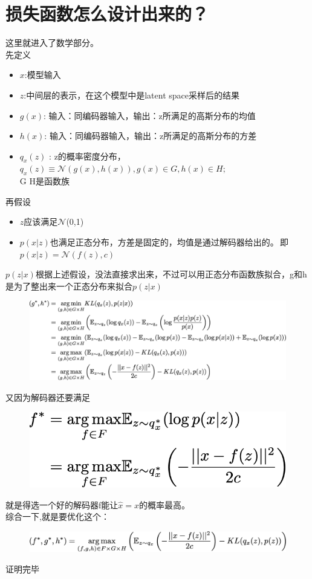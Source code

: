 \documentclass[]{report}
\begin{document}
\section{损失函数怎么设计出来的？}
这里就进入了数学部分。\\
先定义
\begin{itemize}
	\item $x$:模型输入
	\item $z$:中间层的表示，在这个模型中是latent space采样后的结果
	\item $g(x)$: 输入：同编码器输入，输出：z所满足的高斯分布的均值
	\item $h(x)$: 输入：同编码器输入，输出：z所满足的高斯分布的方差
	\item $q_x(z)$ :  z的概率密度分布，$q_x(z) \equiv  \mathcal{N}(g(x),h(x)),g(x)\in G,h(x)\in  H;$\\ G H是函数族
\end{itemize}
再假设
\begin{itemize}
	\item $z$应该满足$\mathcal{N}$(0,1)
	\item $p(x|z)$也满足正态分布，方差是固定的，均值是通过解码器给出的。\,即$p(x|z)=\mathcal{N}(f(z),c)$
\end{itemize}
\newpage
$p(z|x)$根据上述假设，没法直接求出来，不过可以用正态分布函数族拟合，g和h是为了整出来一个正态分布来拟合$p(z|x)$
\begin{figure}[h]
	\centering
	\includegraphics[width=0.9\linewidth]{images/screenshot014}
	\label{fig:screenshot014}
\end{figure}
\FloatBarrier
又因为解码器还要满足
\begin{figure}[h]
	\centering
	\includegraphics[width=0.4\linewidth]{images/screenshot015}
	\label{fig:screenshot015}
\end{figure}
就是得选一个好的解码器f能让$\hat{x}=x$的概率最高。\\
综合一下,就是要优化这个：\begin{figure}[h]
	\centering
	\includegraphics[width=0.7\linewidth]{images/screenshot016}
	\label{fig:screenshot016}
\end{figure}
\FloatBarrier
证明完毕
\end{document}
